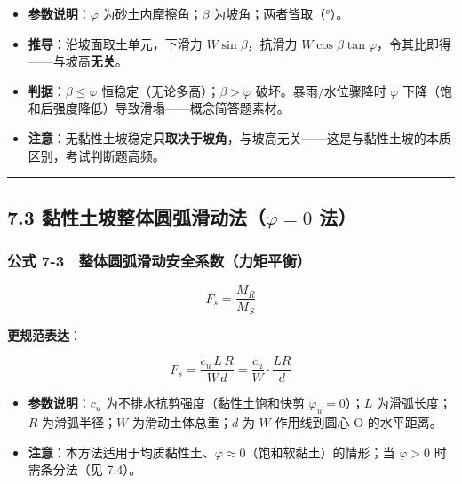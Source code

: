 \documentclass[
]{article}
\providecommand{\tightlist}{%
  \setlength{\itemsep}{0pt}\setlength{\parskip}{0pt}}
\begin{document}
\begin{itemize}
\tightlist
\item
  \textbf{参数说明}：\(\varphi\) 为砂土内摩擦角；\(\beta\)
  为坡角；两者皆取（°）。
\item
  \textbf{推导}：沿坡面取土单元，下滑力 \(W\sin\beta\)，抗滑力
  \(W\cos\beta\tan\varphi\)，令其比即得------与坡高\textbf{无关}。
\item
  \textbf{判据}：\(\beta\le\varphi\)
  恒稳定（无论多高）；\(\beta>\varphi\) 破坏。暴雨/水位骤降时
  \(\varphi\) 下降（饱和后强度降低）导致滑塌------概念简答题素材。
\item
  \textbf{注意}：无黏性土坡稳定\textbf{只取决于坡角}，与坡高无关------这是与黏性土坡的本质区别，考试判断题高频。
\end{itemize}

\begin{center}\rule{0.5\linewidth}{0.5pt}\end{center}

\subsection{\texorpdfstring{7.3 黏性土坡整体圆弧滑动法（\(\varphi=0\)
法）}{7.3 黏性土坡整体圆弧滑动法（\textbackslash varphi=0 法）}}\label{ux9ecfux6027ux571fux5761ux6574ux4f53ux5706ux5f27ux6ed1ux52a8ux6cd5varphi0-ux6cd5}

\subsubsection{公式
7-3　整体圆弧滑动安全系数（力矩平衡）}\label{ux516cux5f0f-7-3-ux6574ux4f53ux5706ux5f27ux6ed1ux52a8ux5b89ux5168ux7cfbux6570ux529bux77e9ux5e73ux8861}

\[F_s=\frac{M_R}{M_S}\]

\textbf{更规范表达}：

\[F_s=\frac{c_u\,L\,R}{W\,d}=\frac{c_u}{W}\cdot\frac{L R}{d}\]

\begin{itemize}
\tightlist
\item
  \textbf{参数说明}：\(c_u\) 为不排水抗剪强度（黏性土饱和快剪
  \(\varphi_u=0\)）；\(L\) 为滑弧长度；\(R\) 为滑弧半径；\(W\)
  为滑动土体总重；\(d\) 为 \(W\) 作用线到圆心 O 的水平距离。
\item
  \textbf{注意}：本方法适用于均质黏性土、\(\varphi\approx0\)（饱和软黏土）的情形；当
  \(\varphi>0\) 时需条分法（见 7.4）。
\end{itemize}
\end{document}
